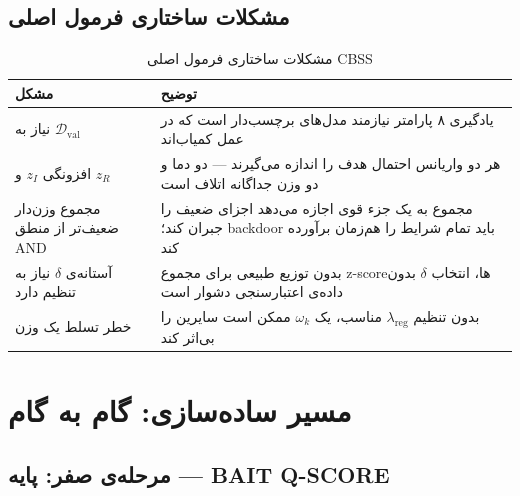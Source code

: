 \documentclass[12pt, a4paper]{article}
\newcommand{\en}[1]{\textenglish{#1}}
\newcommand{\param}[1]{\textcolor{accent}{\texttt{#1}}}
\begin{document}
\subsection{مشکلات ساختاری فرمول اصلی}

\begin{table}[H]
\centering
\small
\begin{tabularx}{\textwidth}{@{} >{\raggedleft\arraybackslash}p{4.5cm} X @{}}
\toprule
\textbf{مشکل} & \textbf{توضیح} \\
\midrule
نیاز به \param{$\mathcal{D}_{\text{val}}$} & یادگیری ۸ پارامتر نیازمند مدل‌های برچسب‌دار است که در عمل کمیاب‌اند \\[4pt]
افزونگی \param{$z_I$} و \param{$z_R$} & هر دو واریانس احتمال هدف را اندازه می‌گیرند --- دو دما و دو وزن جداگانه اتلاف است \\[4pt]
مجموع وزن‌دار ضعیف‌تر از منطق \en{AND} & مجموع به یک جزء قوی اجازه می‌دهد اجزای ضعیف را جبران کند؛ \en{backdoor} باید تمام شرایط را هم‌زمان برآورده کند \\[4pt]
آستانه‌ی \param{$\delta$} نیاز به تنظیم دارد & بدون توزیع طبیعی برای مجموع \en{z-score}ها، انتخاب \param{$\delta$} بدون داده‌ی اعتبارسنجی دشوار است \\[4pt]
خطر تسلط یک وزن & بدون تنظیم \param{$\lambda_{\text{reg}}$} مناسب، یک \param{$\omega_k$} ممکن است سایرین را بی‌اثر کند \\
\bottomrule
\end{tabularx}
\caption{مشکلات ساختاری فرمول اصلی \en{CBSS}}
\end{table}

\section{مسیر ساده‌سازی: گام به گام}

\subsection{مرحله‌ی صفر: پایه --- \en{BAIT Q-SCORE}}

\begin{formulabox}
\begin{en}
\[
\text{Q-SCORE}(a) = \frac{1}{m}\sum_{t=1}^{m} \mathbb{E}\!\left[P_\theta(Y_t = a_t \mid Y_{t-1}=a_{t-1},\ldots,Y_1=a_1,\, X)\right]
\]
\end{en}
\end{formulabox}
\end{document}
